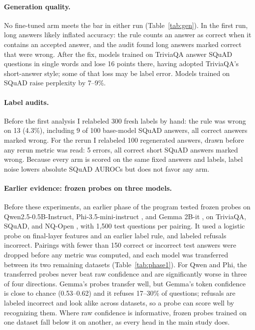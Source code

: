 \documentclass[11pt]{article}
\begin{document}
\paragraph{Generation quality.} No fine-tuned arm meets the bar in either run (Table~\ref{tab:gen}). In the first run, long answers likely inflated accuracy: the rule counts an answer as correct when it contains an accepted answer, and the audit found long answers marked correct that were wrong. After the fix, models trained on TriviaQA answer SQuAD questions in single words and lose 16 points there, having adopted TriviaQA's short-answer style; some of that loss may be label error. Models trained on SQuAD raise perplexity by 7--9\%.

\paragraph{Label audits.} Before the first analysis I relabeled 300 fresh labels by hand: the rule was wrong on 13 (4.3\%), including 9 of 100 base-model SQuAD answers, all correct answers marked wrong. For the rerun I relabeled 100 regenerated answers, drawn before any rerun metric was read: 5 errors, all correct short SQuAD answers marked wrong. Because every arm is scored on the same fixed answers and labels, label noise lowers absolute SQuAD AUROCs but does not favor any arm.

\paragraph{Earlier evidence: frozen probes on three models.} Before these experiments, an earlier phase of the program tested frozen probes on Qwen2.5-0.5B-Instruct, Phi-3.5-mini-instruct \citep{abdin2024phi3}, and Gemma 2B-it \citep{gemma2024}, on TriviaQA, SQuAD, and NQ-Open \citep{kwiatkowski-etal-2019-natural}, with 1,500 test questions per pairing. It used a logistic probe on final-layer features and an earlier label rule, and labeled refusals incorrect. Pairings with fewer than 150 correct or incorrect test answers were dropped before any metric was computed, and each model was transferred between its two remaining datasets (Table~\ref{tab:phase1}). For Qwen and Phi, the transferred probes never beat raw confidence and are significantly worse in three of four directions. Gemma's probes transfer well, but Gemma's token confidence is close to chance (0.53--0.62) and it refuses 17--30\% of questions; refusals are labeled incorrect and look alike across datasets, so a probe can score well by recognizing them. Where raw confidence is informative, frozen probes trained on one dataset fall below it on another, as every head in the main study does.
\end{document}
